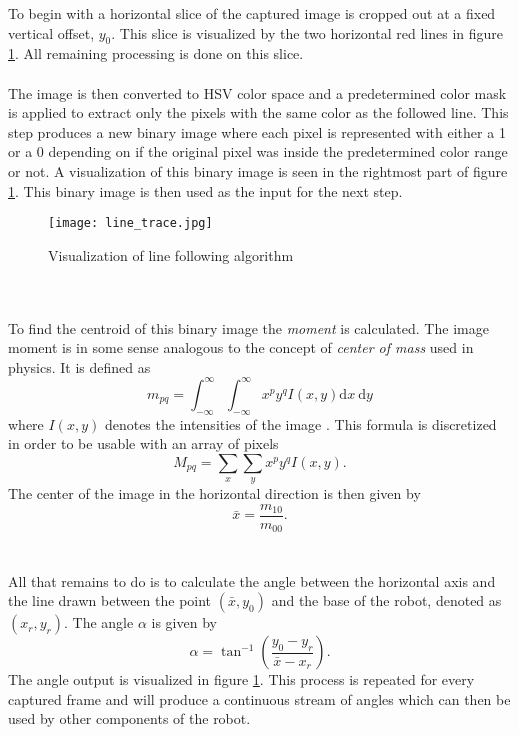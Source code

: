 To begin with a horizontal slice of the captured image is cropped out at a fixed vertical offset, $y_0$. This slice is visualized by the two horizontal red lines in figure \ref{fig:mv_frame}.
All remaining processing is done on this slice.
\\ \\
The image is then converted to HSV color space and a predetermined color mask is applied to extract only the pixels with the same color as the followed line.
This step produces a new binary image where each pixel is represented with either a 1 or a 0 depending on if the original pixel was inside the predetermined color range or not.
A visualization of this binary image is seen in the rightmost part of figure \ref{fig:mv_frame}.
This binary image is then used as the input for the next step.
\begin{figure}[H]
    \centering
    \texttt{[image: line\_trace.jpg]}
    \caption{Visualization of line following algorithm}
    \label{fig:mv_frame}
\end{figure}
\\ \\
To find the centroid of this binary image the \emph{moment} is calculated. The image moment is in some sense analogous to the concept of \emph{center of mass} used in physics. It is defined as
\begin{equation}
m_{p q}=\int_{-\infty}^{\infty} \int_{-\infty}^{\infty} x^{p} y^{q} I(x, y) \mathrm{d} x \mathrm{~d} y
\end{equation}
where $I(x,y)$ denotes the intensities of the image \cite{moment}.
This formula is discretized in order to be usable with an array of pixels
\begin{equation}
M_{p q}=\sum_{x} \sum_{y} x^{p} y^{q} I(x, y).
\end{equation}
The center of the image in the horizontal direction is then given by
\begin{equation}
    \bar{x} = \frac{m_{10}}{m_{00}}.
\end{equation}
\\ \\
All that remains to do is to calculate the angle between the horizontal axis and the line drawn between the point $(\bar{x}, y_0)$ and the base of the robot, denoted as $(x_r, y_r)$.
The angle $\alpha$ is given by
\begin{equation}
    \alpha = \tan^{-1}\left(\frac{y_0 - y_r}{\bar{x} - x_r}\right).
\end{equation}
The angle output is visualized in figure \ref{fig:mv_frame}.
This process is repeated for every captured frame and will produce a continuous stream of angles which can then be used by other components of the robot.

